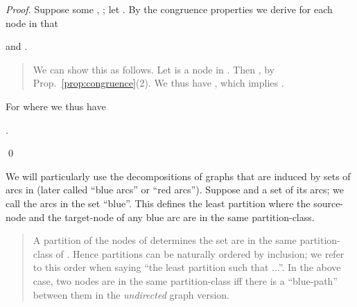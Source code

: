 \documentclass{llncs}
\begin{document}
\begin{proof}
Suppose some , ; let  .
By the congruence properties 
we derive for each node  in  that 
\begin{center}

and .
\end{center} 
\begin{quote}
	{\small	
We can show this as follows.
Let  is a
 node in . 
 Then , 
 by Prop.~\ref{prop:congruence}(2). We thus 
have
,
which implies .
}
\end{quote}
For  where  
we thus have 
\begin{center}
.
\end{center}
\qed
\end{proof}
We will particularly use the decompositions of
graphs  that are induced by sets of arcs in  
(later called ``blue arcs'' or ``red arcs'').
Suppose  and a set of its arcs; we call the arcs in the set
``blue''. This defines the least partition 
where the source-node and the target-node of any blue arc are in the
same partition-class.
\begin{quote}
	{\small	
A partition  of the nodes of 
determines the set  are
in the same partition-class of . Hence partitions can be
naturally ordered by inclusion; we refer to this order when saying ``the
least partition such that ...''.
In the above case, two nodes are in the same partition-class iff there
is a ``blue-path'' between them in the \emph{undirected} graph version.
	}
\end{quote}	
\end{document}
